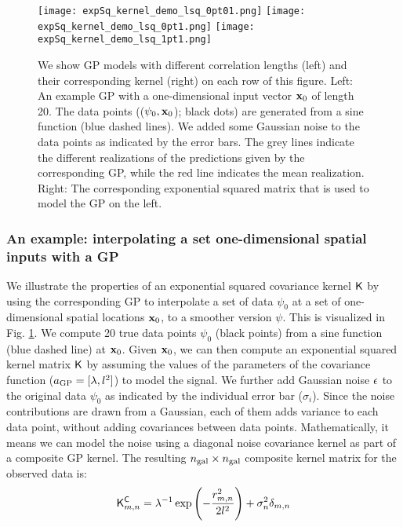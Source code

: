 \begin{figure}
	\centering
	\texttt{[image: expSq\_kernel\_demo\_lsq\_0pt01.png]}
	\texttt{[image: expSq\_kernel\_demo\_lsq\_0pt1.png]}
	\texttt{[image: expSq\_kernel\_demo\_lsq\_1pt1.png]}
	\caption{
		We show GP models with different correlation lengths (left) and their
		corresponding kernel (right) on each row of this figure.
		Left: An example GP with a one-dimensional input vector $\mathbf{x}_0$
		of length 20. The data points (($\psi_0, \mathbf{x}_0$); black dots) 
		are generated from a sine function (blue dashed lines).  
		We added some Gaussian noise to the data points as indicated by the error bars. 
		The grey lines indicate the different realizations of
		the predictions given by the corresponding GP, while the red line indicates the
		mean realization.  
		Right: The corresponding exponential squared matrix that is used to model
		the GP on the left. 
		\label{fig:one_d_gaussian_process}}
\end{figure}


\subsubsection{An example: interpolating a set one-dimensional spatial inputs
with a GP}
\label{subsubsec:interpolation}
We illustrate the properties of an exponential squared covariance kernel $\mathsf{K}$
by using the corresponding GP to interpolate a set of data $\psi_0$  
at a set of one-dimensional spatial locations $\mathbf{x}_0$, to a smoother version
$\psi$. 
This is visualized in Fig. \ref{fig:one_d_gaussian_process}.
We compute 20 true data points $\psi_0$ (black points) from a sine function (blue dashed line) at
$\mathbf{x}_0$.
Given $\mathbf{x}_0$, we can then compute an exponential squared kernel matrix $\mathsf{K}$ 
by assuming the values of the parameters of the covariance function
($a_{\rm GP} = [\lambda, l^2]$) to model the signal. 
We further add Gaussian noise ${\bf\epsilon}$ to the original data $\psi_0$ as
indicated by the individual error bar ($\sigma_i$). 
Since the noise contributions are drawn
from a Gaussian,
each of them adds variance to each data point, without adding covariances
between data points.
Mathematically, it means we can model the noise using a diagonal noise 
covariance kernel as part of a composite GP kernel. 
The resulting $n_{\rm gal} \times n_{\rm gal}$ composite kernel matrix for the observed data is:
\begin{equation}
	\mathsf{K}^{\mathsf{C}}_{m, n} = \lambda^{-1} \exp \left(-\frac{r_{m,n}^2}{2
	l^2}\right) + \sigma_n^2
	\delta_{m, n}
\end{equation}

